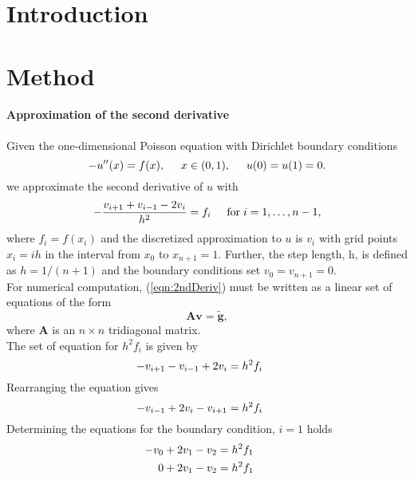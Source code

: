 \documentclass[%
oneside,                 %
final,                   %
10pt]{article}
\begin{document}
\section{Introduction}
\section{Method}
\paragraph{Approximation of the second derivative}
Given the one-dimensional Poisson equation with Dirichlet boundary conditions
\begin{equation*}
-u''(x) = f(x), \hspace{0.5cm} x\in(0,1), \hspace{0.5cm} u(0) = u(1) = 0.
\end{equation*}
we approximate the second derivative of $u$ with
\begin{equation}\label{eqn:2ndDeriv}
   -\frac{v_{i+1}+v_{i-1}-2v_i}{h^2} = f_i  \hspace{0.5cm} \mathrm{for} \hspace{0.1cm} i=1,\dots, n-1,
\end{equation}
where $f_i=f(x_i)$ and the discretized approximation to $u$ is $v_i$ with grid points $x_i = ih$ in the interval from $x_0$ to $x_{n+1}=1$.
Further, the step length, h,  is defined as $h=1/(n+1)$ and the boundary conditions set $v_0 = v_{n+1}=0$. \\
For numerical computation, (\ref{eqn:2ndDeriv}) must be written as a linear set of equations of the form
\begin{equation*}
   \mathbf{A}\mathbf{v} = \tilde{\mathbf{g}},
\end{equation*}
where $\mathbf{A}$ is an $n\times n$  tridiagonal matrix.\\
The set of equation for $h^2f_i$ is given by
\begin{equation*}
   -v_{i+1}-v_{i-1}+2v_i = h^2f_i  \hspace{0.5cm}
\end{equation*}
Rearranging the equation gives
\begin{equation*}
  -v_{i-1}+2v_i - v_{i+1}= h^2f_i  \hspace{0.5cm}
\end{equation*}
Determining the equations for the boundary condition, $i=1$ holds
\begin{equation*}
\begin{aligned}
  -v_{0}+2v_1 - v_{2}&= h^2f_1  \hspace{0.5cm} \\
  0 + 2v_1 - v_{2}&= h^2f_1  \hspace{0.5cm}
\end{aligned}
\end{equation*}
\end{document}
